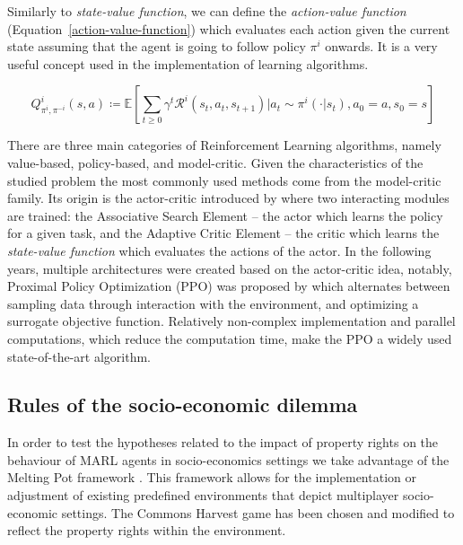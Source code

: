 \documentclass[pdflatex,sn-basic,lineno]{sn-jnl}
\theoremstyle{thmstyleone}%
\theoremstyle{thmstyletwo}%
\theoremstyle{thmstylethree}%
\begin{document}
Similarly to \textit{state-value function}, we can define the \textit{action-value function}
(Equation~\ref{action-value-function}) which evaluates each action given the current state assuming that the agent is
going to follow policy $\pi^i$ onwards. It is a very useful concept used in the implementation of learning algorithms.

\begin{equation}\label{action-value-function}
    Q^i_{\pi^i,\pi^{-i}}(s,a)\coloneqq\mathbb{E}\left[\sum\limits_{t\geq0}\gamma^t\mathcal{R}^i(s_t,a_t,s_{t+1})\bigg| a_t\sim \pi^i(\cdot|s_t),a_0=a,s_0=s\right]
\end{equation}

 There are three main categories of Reinforcement Learning algorithms, namely value-based, policy-based, and
 model-critic. Given the characteristics of the studied problem the most commonly used methods come from the
 model-critic family. Its origin is the actor-critic introduced by \cite{barto1983} where two interacting modules are
 trained: the Associative Search Element -- the actor which learns the policy for a given task, and the Adaptive Critic
 Element -- the critic which learns the \textit{state-value function} which evaluates the actions of the actor. In the
 following years, multiple architectures were created based on the actor-critic idea, notably, Proximal Policy
 Optimization (PPO) was proposed by \cite{Schulman2017} which alternates between sampling data through interaction with
 the environment, and optimizing a surrogate objective function. Relatively non-complex implementation and parallel
 computations, which reduce the computation time, make the PPO a widely used state-of-the-art algorithm.

\subsection{Rules of the socio-economic dilemma}\label{subsec3-2}


In order to test the hypotheses related to the impact of property rights on the behaviour of MARL agents in
socio-economics settings we take advantage of the Melting Pot framework \citep{Leibo2021, agapiou2023meltingpot20}. This
framework allows for the implementation or adjustment of existing predefined environments that depict multiplayer
socio-economic settings. The Commons Harvest game has been chosen and modified to reflect the property rights within the
environment.
\end{document}
